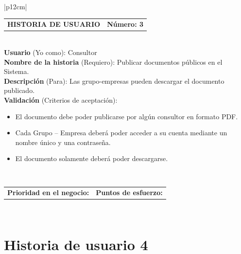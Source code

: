 \documentclass[11pt,letterpaper]{report}
\begin{document}
	\begin{center}	
	\begin{tabular}{|p{12cm}|}
		\hline
		\begin{tabular}{c|c}
			\textbf{HISTORIA DE USUARIO} & \textbf{Número: 3} \\
		\end{tabular} \\ \hline
		\textbf{Usuario} (Yo como): Consultor \\ \hline
		\textbf{Nombre de la historia} (Requiero): Publicar documentos públicos en el Sistema. \\ \hline
		\textbf{Descripción} (Para): Las grupo-empresas pueden descargar el documento publicado. \\ \hline
		\textbf{Validación} (Criterios de aceptación): \\
		\begin{minipage}{12cm}
			\begin{itemize}
				\item El documento debe poder publicarse por algún consultor en formato PDF.
				\item Cada Grupo – Empresa deberá poder acceder a su cuenta mediante un nombre único y una contraseña.
				\item El documento solamente deberá poder descargarse.
			\end{itemize}
		\end{minipage} \\ \hline
		\begin{tabular}{c|c}
			\textbf{Prioridad en el negocio: } & \textbf{Puntos de esfuerzo: } \\
		\end{tabular} \\ \hline
	\end{tabular}
	\end{center}
	
	\section{Historia de usuario 4}
	
\end{document}
